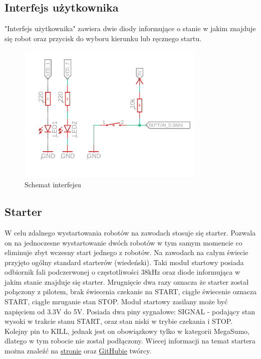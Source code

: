 \documentclass[polish,polish,a4paper]{article}
\begin{document}
    \subsection{Interfejs użytkownika}
        "Interfejs użytkownika" zawiera dwie diody informujące o stanie w jakim znajduje się robot oraz przycisk do wyboru kierunku lub ręcznego startu. 
        
        \begin{figure}[ht!]
        \centering
        \includegraphics[width=90mm]{Scheme/interfejs.jpg}
        \caption{Schemat interfejsu \label{overflow}}
        \end{figure}
        
    \subsection{Starter}
    
    W celu zdalnego wystartowania robotów na zawodach stosuje się starter. Pozwala on na jednoczesne wystartowanie dwóch robotów w tym samym momencie co eliminuje zbyt wczesny start jednego z robotów. Na zawodach na całym świecie przyjęto ogólny standard starterów (wiedeński). Taki moduł startowy posiada odbiornik fali podczerwonej o częstotliwości 38kHz oraz diode informująca w jakim stanie znajduje się starter. Mrugnięcie dwa razy oznacza że starter został połączony z pilotem, brak świecenia czekanie na START, ciągłe świecenie oznacza START, ciągłe mruganie stan STOP. 
    \newline
    Moduł startowy zasilany może być napięciem od 3.3V do 5V. Posiada dwa piny sygnałowe: SIGNAL - podający stan wysoki w trakcie stanu START, oraz stan niski w trybie czekania i STOP. Kolejny pin to KILL, jednak jest on obowiązkowy tylko w kategorii MegaSumo, dlatego w tym robocie nie został podłączony.
    \newline 
    Wiecej informacji na temat startera można znaleźć na \href{https://p1r.se/startmodule/}{stronie} oraz \href{https://github.com/p1rse/robot-sumo-start-module}{GitHubie} twórcy.
    
\end{document}
